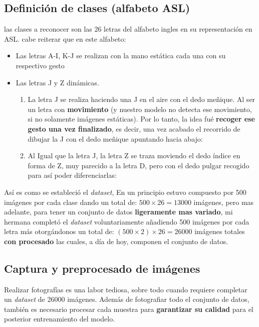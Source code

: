 \subsection{Definición de clases (alfabeto ASL)}
las clases a reconocer son las 26 letras del alfabeto ingles en su representación en ASL. cabe reiterar que en este alfabeto:
\begin{itemize}
\tightlist
    \item Las letras A-I, K-J se realizan con la mano estática cada una con su respectivo gesto

    \item Las letras J y Z dinámicas.
        \begin{enumerate}
            
        \item La letra J se realiza haciendo una J en el aire con el dedo meñique. Al ser un letra con \textbf{movimiento} (y nuestro modelo no detecta ese movimiento, si no solamente imágenes estáticas). Por lo tanto, la idea fué \textbf{recoger ese gesto una vez finalizado}, es decir, una vez acabado el recorrido de dibujar la J con el dedo meñique apuntando hacia abajo:
        
    
        \item Al Igual que la letra J, la letra Z se traza moviendo el dedo índice en forma de Z, muy parecido a la letra D, pero con el dedo pulgar recogido para así poder diferenciarlas:


        \end{enumerate}
\end{itemize}

Así es como se estableció el \textit{dataset}, En un principio estuvo compuesto por 500 imágenes por cada clase dando un total de: $500 \times 26 = 13000$ imágenes, pero mas adelante, para tener un conjunto de datos \textbf{ligeramente mas variado}, mi hermana completó el \textit{dataset} voluntariamente añadiendo 500 imágenes por cada letra más otorgándonos un total de: $(500 \times 2) \times 26 = 26000$ imágenes totales \textbf{con procesado} las cuales, a día de hoy, componen el conjunto de datos.

\subsection{Captura y preprocesado de imágenes}\label{captura-imagenes-y-prerpocesado}
Realizar fotografías es una labor tediosa, sobre todo cuando requiere completar un \textit{dataset} de 26000 imágenes. Además de fotografiar todo el conjunto de datos, también es necesario procesar cada muestra para \textbf{garantizar su calidad} para el posterior entrenamiento del modelo.


